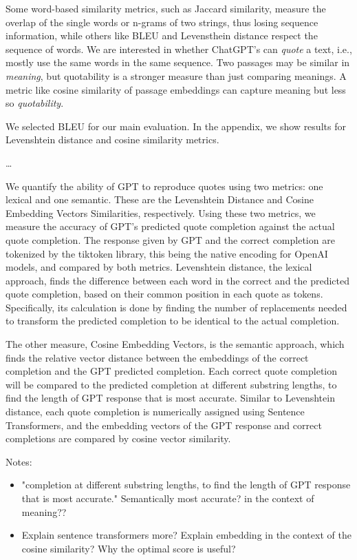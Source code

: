 \documentclass{article}
\begin{document}
Some word-based similarity metrics, such as Jaccard similarity, measure the overlap of the single words or n-grams of two strings, thus losing sequence information, while others like BLEU and Levensthein distance respect the sequence of words. We are interested in whether ChatGPT's can \emph{quote} a text, i.e., mostly use the same words in the same sequence. Two passages may be similar in \emph{meaning}, but quotability is a stronger measure than just comparing meanings. A metric like cosine similarity of passage embeddings can capture meaning but less so \emph{quotability}.

We selected BLEU for our main evaluation. In the appendix, we show results for Levenshtein distance and cosine similarity metrics.

\dots

We quantify the ability of GPT to reproduce quotes using two metrics: one lexical and one semantic. These are the Levenshtein Distance and Cosine Embedding Vectors Similarities, respectively. Using these two metrics, we measure the accuracy of GPT's predicted quote completion against the actual quote completion. The response given by GPT and the correct completion are tokenized by the tiktoken library, this being the native encoding for OpenAI models, and compared by both metrics. Levenshtein distance, the lexical approach, finds the difference between each word in the correct and the predicted quote completion, based on their common position in each quote as tokens. Specifically, its calculation is done by finding the number of replacements needed to transform the predicted completion to be identical to the actual completion.

The other measure, Cosine Embedding Vectors, is the semantic approach, which finds the relative vector distance between the embeddings of the correct completion and the GPT predicted completion. Each correct quote completion will be compared to the predicted completion at different substring lengths, to find the length of GPT response that is most accurate. Similar to Levenshtein distance, each quote completion is numerically assigned using Sentence Transformers, and the embedding vectors of the GPT response and correct completions are compared by cosine vector similarity.

Notes:
\begin{itemize}
\item "completion at different substring lengths, to find the length of GPT response that is most accurate." Semantically most accurate? in the context of meaning?? 

\item Explain sentence transformers more? Explain embedding in the context of the cosine similarity? Why the optimal score is useful?
\end{itemize}
\end{document}
